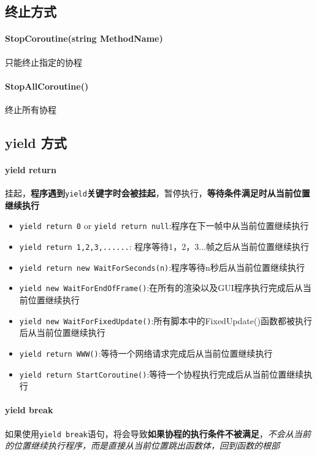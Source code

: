 \documentclass[UTF8,a4paper,12pt]{ctexbook}
\begin{document}
		\subsection{终止方式}
			\paragraph{StopCoroutine(string MethodName)}
				只能终止指定的协程
			
			\paragraph{StopAllCoroutine()}
				终止所有协程
				
		\subsection{yield 方式}
			\paragraph{yield return}
				挂起，\textbf{程序遇到}\verb|yield|\textbf{关键字时会被挂起}，暂停执行，\textbf{等待条件满足时从当前位置继续执行}
				
				\begin{itemize}
					\item \verb|yield return 0| or \verb|yield return null|:程序在下一帧中从当前位置继续执行
					\item \verb|yield return 1,2,3,......|: 程序等待1，2，3...帧之后从当前位置继续执行
					\item \verb|yield return new WaitForSeconds(n)|:程序等待n秒后从当前位置继续执行
					\item \verb|yield new WaitForEndOfFrame()|:在所有的渲染以及GUI程序执行完成后从当前位置继续执行
					\item \verb|yield new WaitForFixedUpdate()|:所有脚本中的FixedUpdate()函数都被执行后从当前位置继续执行
					\item \verb|yield return WWW()|:等待一个网络请求完成后从当前位置继续执行
					\item \verb|yield return StartCoroutine()|:等待一个协程执行完成后从当前位置继续执行
				\end{itemize}
			
			\paragraph{yield break}
				如果使用\verb|yield break|语句，将会导致\textbf{如果协程的执行条件不被满足}，\textit{不会从当前的位置继续执行程序，而是直接从当前位置跳出函数体，回到函数的根部}
				
\end{document}
